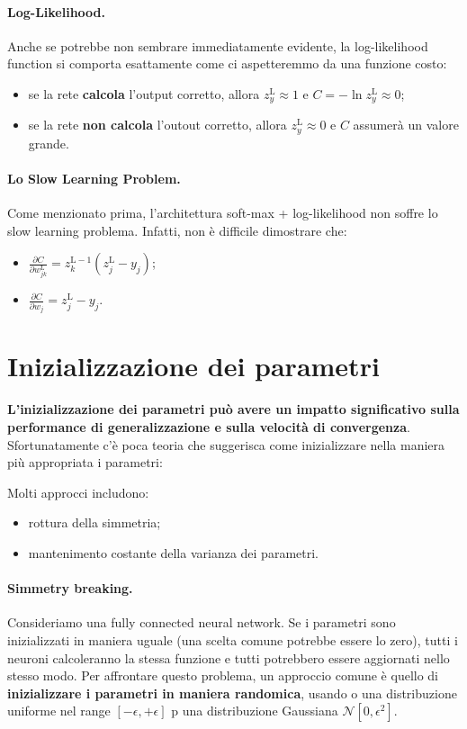 \paragraph{Log-Likelihood.} Anche se potrebbe non sembrare immediatamente evidente, la log-likelihood function si comporta esattamente come ci aspetteremmo da una funzione costo:
\begin{itemize}
    \item se la rete \textbf{calcola} l'output corretto, allora $z^\text{L}_y\approx1$ e $C=-\ln{z^\text{L}_y}\approx0$;
    \item se la rete \textbf{non calcola} l'outout corretto, allora $z^\text{L}_y\approx0$ e $C$ assumerà un valore grande.
\end{itemize}


\paragraph{Lo Slow Learning Problem.} Come menzionato prima, l'architettura soft-max + log-likelihood non soffre lo slow learning problema. Infatti, non è difficile dimostrare che:
\begin{itemize}
    \item $\frac{\partial C}{\partial w_{jk}^\text{L}}= z^{\text{L}-1}_k(z^{\text{L}}_j-y_j)$;
    \item $\frac{\partial C}{\partial w_j}=z^{\text{L}}_j-y_j$.
\end{itemize}
\newpage
\section{Inizializzazione dei parametri}
\textbf{L'inizializzazione dei parametri può avere un impatto significativo sulla performance di generalizzazione e sulla velocità di convergenza}. Sfortunatamente c'è poca teoria che suggerisca come inizializzare nella maniera più appropriata i parametri:



Molti approcci includono:
\begin{itemize}
    \item rottura della simmetria;
    \item mantenimento costante della varianza dei parametri.
\end{itemize}


\paragraph{Simmetry breaking.} Consideriamo una fully connected neural network. Se i parametri sono inizializzati in maniera uguale (una scelta comune potrebbe essere lo zero), tutti i neuroni calcoleranno la stessa funzione e tutti potrebbero essere aggiornati nello stesso modo. Per affrontare questo problema, un approccio comune è quello di \textbf{inizializzare i parametri in maniera randomica}, usando o una distribuzione uniforme nel range $[-\epsilon,+\epsilon]$ p una distribuzione Gaussiana $\mathcal{N}[0,\epsilon^2]$.

